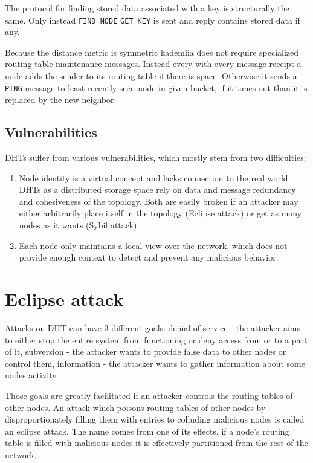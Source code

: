   The protocol for finding stored data associated with a key is structurally the
  same. Only instead \verb|FIND_NODE| \verb|GET_KEY| is sent and reply contains
  stored data if any.

  Because the distance metric is symmetric kademlia does not require specialized
  routing table maintenance messages. Instead every with every message receipt
  a node adds the sender to its routing table if there is space. Otherwise it
  sends a \verb|PING| message to least recently seen node in given bucket, if it
  times-out than it is replaced by the new neighbor.

\subsection{Vulnerabilities}
  DHTs suffer from various vulnerabilities, which mostly stem
  from two difficulties:
  \begin{enumerate}
    \item Node identity is a virtual concept and lacks connection to the real
      world. DHTs as a distributed storage space rely on data and message
      redundancy and cohesiveness of the topology. Both are easily broken if an
      attacker may either arbitrarily place itself in the topology (Eclipse
      attack) or get as many nodes as it wants (Sybil attack).

    \item Each node only maintains a local view over the network, which does not
      provide enough context to detect and prevent any malicious behavior.
  \end{enumerate}

\section{Eclipse attack}
  Attacks on DHT can have 3 different goals:
  denial of service - the attacker aims to either stop the entire system from
  functioning or deny access from or to a part of it,
  subversion - the attacker wants to provide false data to other nodes or
  control them,
  information - the attacker wants to gather information about some nodes
  activity.

  Those goals are greatly facilitated if an attacker controls the routing tables
  of other nodes. An attack which poisons routing tables of other nodes by
  disproportionately filling them with entries to colluding malicious nodes is
  called an eclipse attack. The name comes from one of its effects, if a node's
  routing table is filled with malicious nodes it is effectively partitioned
  from the rest of the network.

